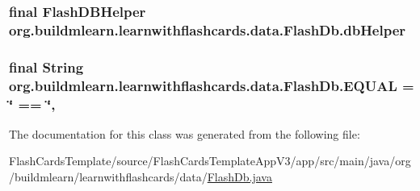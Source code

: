 \subsubsection[{\texorpdfstring{db\+Helper}{dbHelper}}]{\setlength{\rightskip}{0pt plus 5cm}final Flash\+D\+B\+Helper org.\+buildmlearn.\+learnwithflashcards.\+data.\+Flash\+Db.\+db\+Helper\hspace{0.3cm}{\ttfamily [private]}}\hypertarget{classorg_1_1buildmlearn_1_1learnwithflashcards_1_1data_1_1FlashDb_aa4f4f1766677fb1a2fb50c7b771a59d4}{}\label{classorg_1_1buildmlearn_1_1learnwithflashcards_1_1data_1_1FlashDb_aa4f4f1766677fb1a2fb50c7b771a59d4}
\subsubsection[{\texorpdfstring{E\+Q\+U\+AL}{EQUAL}}]{\setlength{\rightskip}{0pt plus 5cm}final String org.\+buildmlearn.\+learnwithflashcards.\+data.\+Flash\+Db.\+E\+Q\+U\+AL = \char`\"{} == \char`\"{}\hspace{0.3cm}{\ttfamily [static]}, {\ttfamily [private]}}\hypertarget{classorg_1_1buildmlearn_1_1learnwithflashcards_1_1data_1_1FlashDb_a829e7276c4c3e65c62f653d4c814f7c7}{}\label{classorg_1_1buildmlearn_1_1learnwithflashcards_1_1data_1_1FlashDb_a829e7276c4c3e65c62f653d4c814f7c7}


The documentation for this class was generated from the following file\+:\begin{DoxyCompactItemize}
\item 
Flash\+Cards\+Template/source/\+Flash\+Cards\+Template\+App\+V3/app/src/main/java/org/buildmlearn/learnwithflashcards/data/\hyperlink{FlashDb_8java}{Flash\+Db.\+java}\end{DoxyCompactItemize}
